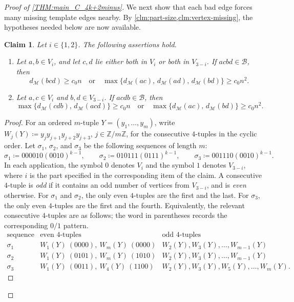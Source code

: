 \documentclass[10pt,a4paper]{article}
\theoremstyle{plain}
\newtheorem{claim}[claim]{Claim}
\theoremstyle{definition}
\begin{document}
\begin{proof}[Proof of \cref{THM:main_C_4k+2minus}]
We next show that each bad edge forces many missing template edges nearby.
By \cref{clm:part-size,clm:vertex-missing}, the hypotheses needed below are now available.

\begin{claim}\label{clm:local-forcing}
Let $i\in\{1,2\}$.
The following assertions hold.
\begin{enumerate}[label=\textup{(\roman*)},ref=\textup{(\roman*)}]
\item\label{itm:local-forcing-same}
Let $a,b\in V_i$, and let $c,d$ lie either both in $V_i$ or both in $V_{3-i}$. If $acbd\in\mathcal B$, then 
\[
d_{\mathcal M}(bcd)\ge c_0n 
\quad\text{or}\quad 
\max\{d_{\mathcal M}(ac),\,d_{\mathcal M}(ad),\,d_{\mathcal M}(bd)\}\ge c_0n^2.
\]

\item\label{itm:local-forcing-cross}
Let $a,c\in V_i$ and $b,d\in V_{3-i}$. If $acdb\in\mathcal B$, then 
\[
\max\{d_{\mathcal M}(cdb),\,d_{\mathcal M}(acd)\}\ge c_0n
\quad\text{or}\quad \max\{d_{\mathcal M}(ac),\,d_{\mathcal M}(bd)\}\ge c_0n^2.
\]
\end{enumerate}
\end{claim}

\begin{proof}
For an ordered $m$-tuple $Y=(y_1,\ldots,y_m)$, write $W_j(Y)\coloneqq y_jy_{j+1}y_{j+2}y_{j+3}$, $j\in \mathbb Z/m\mathbb Z$, for the consecutive $4$-tuples in the cyclic order. Let $\sigma_1$, $\sigma_2$, and $\sigma_3$ be the following sequences of length $m$:
\[
\sigma_1\coloneqq000010(0010)^{k-1},\qquad
\sigma_2\coloneqq010111(0111)^{k-1},\qquad
\sigma_3\coloneqq001110(0010)^{k-1}.
\]
In each application, the symbol $0$ denotes $V_i$ and the symbol $1$ denotes $V_{3-i}$, where $i$ is the part specified in the corresponding item of the claim. A consecutive $4$-tuple is \emph{odd} if it contains an odd number of vertices from $V_{3-i}$, and is \emph{even} otherwise. For $\sigma_1$ and $\sigma_2$, the only even $4$-tuples are the first and the last. For $\sigma_3$, the only even $4$-tuples are the first and the fourth.
Equivalently, the relevant consecutive $4$-tuples are as follows; the word in parentheses records the corresponding $0/1$ pattern.
\[
\begin{array}{c|c|c}
\text{sequence} & \text{even }4\text{-tuples} & \text{odd }4\text{-tuples}\\ \hline
\sigma_1 & W_1(Y)\ (0000),\ W_m(Y)\ (0000) & W_2(Y),W_3(Y),\ldots,W_{m-1}(Y)\\
\sigma_2 & W_1(Y)\ (0101),\ W_m(Y)\ (1010) & W_2(Y),W_3(Y),\ldots,W_{m-1}(Y)\\
\sigma_3 & W_1(Y)\ (0011),\ W_4(Y)\ (1100) & W_2(Y),W_3(Y),W_5(Y),\ldots,W_m(Y).
\end{array}
\]




\end{proof}
\end{proof}
\end{document}
